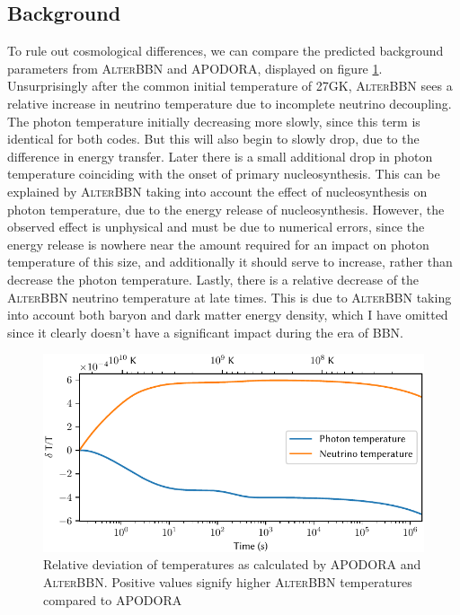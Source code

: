 \subsection{Background}
\label{sec:AlterBackground}
To rule out cosmological differences, we can compare the predicted background parameters from \textsc{AlterBBN} and APODORA, displayed on figure \ref{fig:comparetemp}. Unsurprisingly after the common initial temperature of 27GK, \textsc{AlterBBN} sees a relative increase in neutrino temperature due to incomplete neutrino decoupling. The photon temperature initially decreasing more slowly, since this term is identical for both codes. But this will also begin to slowly drop, due to the difference in energy transfer. Later there is a small additional drop in photon temperature coinciding with the onset of primary nucleosynthesis. This can be explained by \textsc{AlterBBN} taking into account the effect of nucleosynthesis on photon temperature, due to the energy release of nucleosynthesis. However, the observed effect is unphysical and must be due to numerical errors, since the energy release is nowhere near the amount required for an impact on photon temperature of this size, and additionally it should serve to increase, rather than decrease the photon temperature. Lastly, there is a relative decrease of the \textsc{AlterBBN} neutrino temperature at late times. This is due to \textsc{AlterBBN} taking into account both baryon and dark matter energy density, which I have omitted since it clearly doesn't have a significant impact during the era of BBN.
\begin{figure}[ht]
    \includegraphics[width=5.1in]{figures/comparetemp.pdf}
    \caption{Relative deviation of temperatures as calculated by APODORA and \textsc{AlterBBN}. Positive values signify higher \textsc{AlterBBN} temperatures compared to APODORA}
    \label{fig:comparetemp}
\end{figure}

